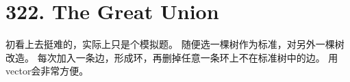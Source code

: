 \section{322. The Great Union}
初看上去挺难的，实际上只是个模拟题。
随便选一棵树作为标准，对另外一棵树改造。
每次加入一条边，形成环，再删掉任意一条环上不在标准树中的边。
用vector会非常方便。
